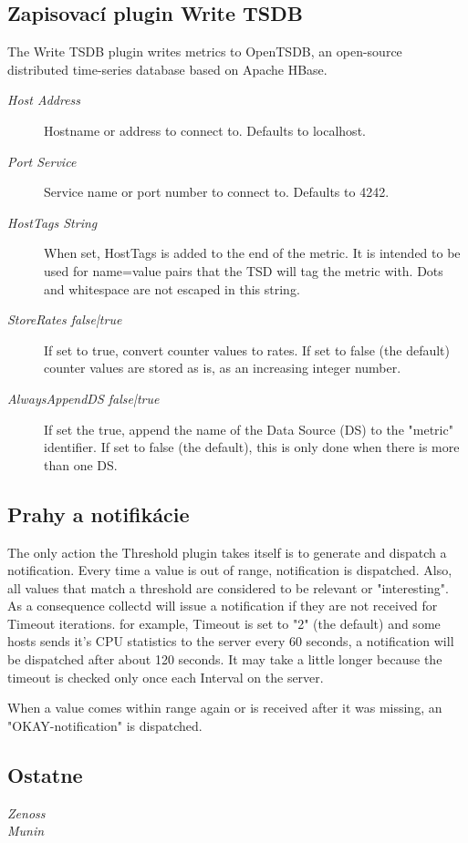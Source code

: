 \documentclass[11pt,final,oneside]{fithesis}
\begin{document}
\subsection{Zapisovací plugin Write TSDB}
The Write TSDB plugin writes metrics to OpenTSDB, an open-source distributed time-series database based on Apache HBase.
\cite{13}

\begin{description}
\item[\emph{Host Address}] Hostname or address to connect to. Defaults to localhost.
\item[\emph{Port Service}] Service name or port number to connect to. Defaults to 4242.
\item[\emph{HostTags String}] When set, HostTags is added to the end of the metric. It is intended to be used for name=value pairs that the TSD will tag the metric with. Dots and whitespace are not escaped in this string.
\item[\emph{StoreRates false|true}] If set to true, convert counter values to rates. If set to false (the default) counter values are stored as is, as an increasing integer number.
\item[\emph{AlwaysAppendDS false|true}] If set the true, append the name of the Data Source (DS) to the "metric" identifier. If set to false (the default), this is only done when there is more than one DS.
\end{description}

\subsection{Prahy a notifikácie}

The only action the Threshold plugin takes itself is to generate and dispatch a notification. Every time a value is out of range, 
notification is dispatched. 
Also, all values that match a threshold are considered to be relevant or "interesting". As a consequence collectd will issue a notification 
if they are not received for Timeout iterations.  for example, Timeout is set to "2" (the default) and some hosts sends it's CPU statistics to the server every 60 seconds, a notification will be dispatched after about 120 seconds. It may take a little longer because the timeout is checked only once each Interval on the server.

When a value comes within range again or is received after it was missing, an "OKAY-notification" is dispatched.
\cite{14}

\subsection{Ostatne} 
\begin{description}
\item[\emph{Zenoss}]
\item[\emph{Munin}]
\end{description}
\end{document}
